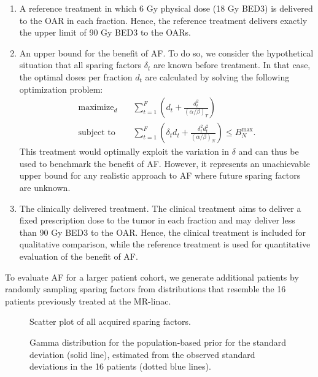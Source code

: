 \documentclass[11pt]{article}
\begin{document}
\begin{enumerate}
\item A reference treatment in which 6 Gy physical dose (18 Gy BED3) is delivered to the OAR in each fraction. Hence, the reference treatment delivers exactly the upper limit of 90 Gy BED3 to the OARs.
\item An upper bound for the benefit of AF. To do so, we consider the hypothetical situation that all sparing factors $\delta_t$ are known before treatment. In that case, the optimal doses per fraction $d_t$ are calculated by solving the following optimization problem:
\begin{equation}
\begin{aligned}
\text{maximize}_{d}\quad & \sum_{t=1}^{F}\left(d_t + \frac{d_t^2}{(\alpha/\beta)_T}\right) \\
\text{subject to}\quad & \sum_{t=1}^{F}\left(\delta_t d_t + \frac{\delta_t^2 d_t^2}{(\alpha/\beta)_N}\right) \leq B_N^{\max}.
\end{aligned}
\label{eq:upper-bound}
\end{equation}
This treatment would optimally exploit the variation in $\delta$ and can thus be used to benchmark the benefit of AF. However, it represents an unachievable upper bound for any realistic approach to AF where future sparing factors are unknown.
\item The clinically delivered treatment. The clinical treatment aims to deliver a fixed prescription dose to the tumor in each fraction and may deliver less than 90 Gy BED3 to the OAR. Hence, the clinical treatment is included for qualitative comparison, while the reference treatment is used for quantitative evaluation of the benefit of AF.
\end{enumerate}

To evaluate AF for a larger patient cohort, we generate additional patients by randomly sampling sparing factors from distributions that resemble the 16 patients previously treated at the MR-linac.

\begin{figure}[ht]
\centering
{}
\caption{Scatter plot of all acquired sparing factors.}
\label{fig:scatter-sparing-factors}
\end{figure}

\begin{figure}[ht]
\centering
{}
\caption{Gamma distribution for the population-based prior for the standard deviation (solid line), estimated from the observed standard deviations in the 16 patients (dotted blue lines).}
\label{fig:gamma-prior}
\end{figure}
\end{document}
